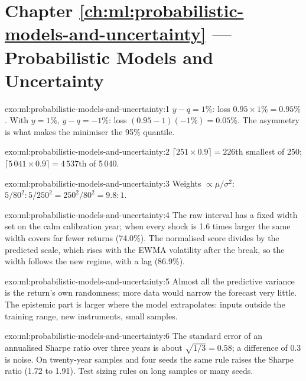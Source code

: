 \section*{Chapter \ref{ch:ml:probabilistic-models-and-uncertainty} --- Probabilistic Models and Uncertainty}

\begin{solution}{exo:ml:probabilistic-models-and-uncertainty:1}
$y - q = 1\%$: loss $0.95\times1\% = 0.95\%$. With $y = 1\%$, $y - q = -1\%$: loss $(0.95 - 1)(-1\%) = 0.05\%$. The
asymmetry is what makes the minimiser the 95\% quantile.
\end{solution}

\begin{solution}{exo:ml:probabilistic-models-and-uncertainty:2}
$\lceil251\times0.9\rceil = 226$th smallest of 250; $\lceil5\,041\times0.9\rceil = 4\,537$th of 5\,040.
\end{solution}

\begin{solution}{exo:ml:probabilistic-models-and-uncertainty:3}
Weights $\propto\mu/\sigma^2$: $5/80^2 : 5/250^2 = 250^2/80^2 = 9.8 : 1$.
\end{solution}

\begin{solution}{exo:ml:probabilistic-models-and-uncertainty:4}
The raw interval has a fixed width set on the calm calibration year; when every shock is 1.6 times larger the same width
covers far fewer returns (74.0\%). The normalised score divides by the predicted scale, which rises with the EWMA
volatility after the break, so the width follows the new regime, with a lag (86.9\%).
\end{solution}

\begin{solution}{exo:ml:probabilistic-models-and-uncertainty:5}
Almost all the predictive variance is the return's own randomness; more data would narrow the forecast very little. The
epistemic part is larger where the model extrapolates: inputs outside the training range, new instruments, small
samples.
\end{solution}

\begin{solution}{exo:ml:probabilistic-models-and-uncertainty:6}
The standard error of an annualised Sharpe ratio over three years is about $\sqrt{1/3} = 0.58$; a difference of 0.3 is
noise. On twenty-year samples and four seeds the same rule raises the Sharpe ratio (1.72 to 1.91). Test sizing rules on
long samples or many seeds.
\end{solution}

